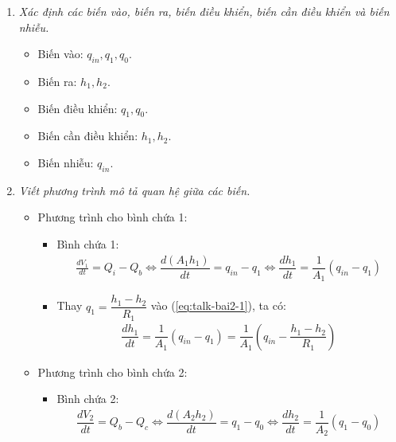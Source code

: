 \documentclass[12pt,a4paper]{article}
\begin{document}
        \begin{enumerate}[\it a.]
            \item \textit{Xác định các biến vào, biến ra, biến điều khiển, biến cần điều khiển và biến nhiễu.}
                \begin{itemize}
                    \item Biến vào: $q_{in}, q_1, q_0$.
                    \item Biến ra: $h_1, h_2$.
                    \item Biến điều khiển: $q_1, q_0$.
                    \item Biến cần điều khiển: $h_1, h_2$.
                    \item Biến nhiễu: $q_{in}$.
                \end{itemize}

            \item \textit{Viết phương trình mô tả quan hệ giữa các biến.}
                \begin{itemize}
                    \item Phương trình cho bình chứa 1:
                        \begin{itemize}
                            \item Bình chứa 1:
                                \begin{align} \label{eq:talk-bai2-1}
                                    \frac{dV_1}{dt} = Q_i - Q_b \Longleftrightarrow \dfrac{d \left({A_1 h_1}\right)}{dt} = q_{in} - q_1 \Longleftrightarrow \dfrac{d h_1}{dt} = \dfrac{1}{A_1} \left({q_{in} - q_1}\right)
                                \end{align}

                            \item Thay $q_1 = \dfrac{h_1 - h_2}{R_1}$ vào (\ref{eq:talk-bai2-1}), ta có:
                                \begin{align} \label{eq:talk-bai2-1-2}
                                    \dfrac{d h_1}{dt} = \dfrac{1}{A_1} \left({q_{in} - q_1}\right) = \dfrac{1}{A_1} \left({q_{in} - \dfrac{h_1 - h_2}{R_1}}\right)
                                \end{align}
                        \end{itemize}

                    \item Phương trình cho bình chứa 2:
                        \begin{itemize}
                            \item Bình chứa 2:
                                \begin{align} \label{eq:talk-bai2-2}
                                    \dfrac{dV_2}{dt} = Q_b - Q_c \Longleftrightarrow \dfrac{d \left({A_2 h_2}\right)}{dt} = q_1 - q_0 \Longleftrightarrow \dfrac{d h_2}{dt} = \dfrac{1}{A_2} \left({q_1 - q_0}\right)
                                \end{align}


\end{itemize}
\end{itemize}
\end{enumerate}
\end{document}
